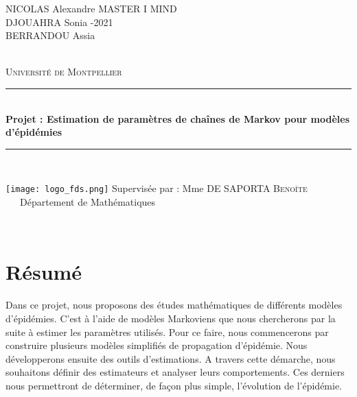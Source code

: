 \documentclass[12pt,a4paper]{report}
\newcommand{\HRule}{\rule{\linewidth}{0.5mm}}
\theoremstyle{remark}
\begin{document}
\begin{titlepage}
  \begin{sffamily}  
      \flushleft NICOLAS Alexandre \qquad \qquad \qquad \qquad \qquad\qquad \qquad \qquad  \qquad\qquad \qquad \qquad \qquad  MASTER I MIND
      \\DJOUAHRA Sonia \qquad \qquad \qquad    \qquad \qquad \qquad \qquad \qquad \qquad \qquad \qquad \qquad \qquad \qquad {}-2021
      \\BERRANDOU Assia

  \begin{center}
 \textsc{}\\[4cm]
    \textsc{\LARGE Université de Montpellier}\\[2cm]
    \HRule \\[0.4cm]
    { \huge \bfseries Projet : Estimation de paramètres de chaînes de Markov pour modèles d'épidémies\\[0.4cm] }
    \HRule \\[2cm]
    \vspace{4cm}
    \begin{minipage}{1\textwidth}
      \begin{flushleft}
       \texttt{[image: logo\_fds.png]}
       \qquad \qquad\qquad\qquad\qquad\qquad\qquad Supervisée par : Mme DE SAPORTA \textsc{Benoîte}\\
       \qquad\qquad\qquad\qquad\qquad\qquad\qquad\qquad\qquad \qquad\qquad \qquad\qquad\qquad\ \ \  Département de Mathématiques
       \end{flushleft}
    \end{minipage}
     \textsc{}\\[1.2cm]
    \vfill
  \end{center}
  \end{sffamily}
\end{titlepage}

\newpage
\section*{Résumé}
\vspace{0.6cm}

Dans ce projet, nous proposons des études mathématiques de différents modèles d'épidémies. C'est à l'aide de modèles Markoviens que nous chercherons par la suite à estimer les paramètres utilisés. Pour ce faire, nous commencerons par construire plusieurs modèles simplifiés de propagation d'épidémie. Nous développerons ensuite des outils d'estimations. A travers cette démarche, nous souhaitons définir des estimateurs et analyser leurs comportements. Ces derniers nous permettront de déterminer, de façon plus simple, l'évolution de l'épidémie.  
\end{document}
